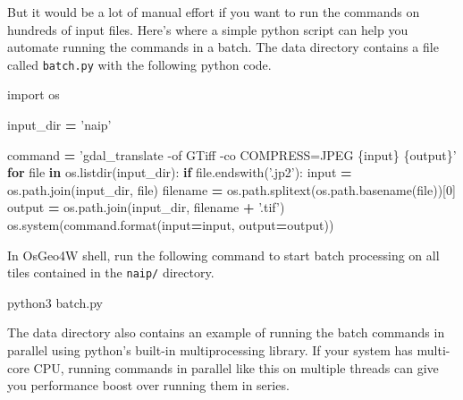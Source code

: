 \documentclass[12pt,a4paper]{article}
\newenvironment{Shaded}{\begin{snugshade}}{\end{snugshade}}
\newcommand{\BuiltInTok}[1]{#1}
\newcommand{\ControlFlowTok}[1]{\textcolor[rgb]{0.13,0.29,0.53}{\textbf{#1}}}
\newcommand{\DecValTok}[1]{\textcolor[rgb]{0.00,0.00,0.81}{#1}}
\newcommand{\ExtensionTok}[1]{#1}
\newcommand{\ImportTok}[1]{#1}
\newcommand{\KeywordTok}[1]{\textcolor[rgb]{0.13,0.29,0.53}{\textbf{#1}}}
\newcommand{\NormalTok}[1]{#1}
\newcommand{\OperatorTok}[1]{\textcolor[rgb]{0.81,0.36,0.00}{\textbf{#1}}}
\newcommand{\SpecialCharTok}[1]{\textcolor[rgb]{0.00,0.00,0.00}{#1}}
\newcommand{\StringTok}[1]{\textcolor[rgb]{0.31,0.60,0.02}{#1}}
\begin{document}
But it would be a lot of manual effort if you want to run the commands
on hundreds of input files. Here's where a simple python script can help
you automate running the commands in a batch. The data directory
contains a file called \texttt{batch.py} with the following python code.

\begin{Shaded}
\begin{Highlighting}[]
\ImportTok{import}\NormalTok{ os}

\NormalTok{input_dir }\OperatorTok{=} \StringTok{'naip'}

\NormalTok{command }\OperatorTok{=} \StringTok{'gdal_translate -of GTiff -co COMPRESS=JPEG }\SpecialCharTok{\{input\}}\StringTok{ }\SpecialCharTok{\{output\}}\StringTok{'}
\ControlFlowTok{for} \BuiltInTok{file} \KeywordTok{in}\NormalTok{ os.listdir(input_dir):}
  \ControlFlowTok{if} \BuiltInTok{file}\NormalTok{.endswith(}\StringTok{'.jp2'}\NormalTok{):}
    \BuiltInTok{input} \OperatorTok{=}\NormalTok{ os.path.join(input_dir, }\BuiltInTok{file}\NormalTok{)}
\NormalTok{    filename }\OperatorTok{=}\NormalTok{ os.path.splitext(os.path.basename(}\BuiltInTok{file}\NormalTok{))[}\DecValTok{0}\NormalTok{]}
\NormalTok{    output }\OperatorTok{=}\NormalTok{  os.path.join(input_dir, filename }\OperatorTok{+} \StringTok{'.tif'}\NormalTok{)}
\NormalTok{    os.system(command.}\BuiltInTok{format}\NormalTok{(}\BuiltInTok{input}\OperatorTok{=}\BuiltInTok{input}\NormalTok{, output}\OperatorTok{=}\NormalTok{output))}
\end{Highlighting}
\end{Shaded}

In OsGeo4W shell, run the following command to start batch processing on
all tiles contained in the \texttt{naip/} directory.

\begin{Shaded}
\begin{Highlighting}[]
\ExtensionTok{python3}\NormalTok{ batch.py}
\end{Highlighting}
\end{Shaded}

The data directory also contains an example of running the batch
commands in parallel using python's built-in multiprocessing library. If
your system has multi-core CPU, running commands in parallel like this
on multiple threads can give you performance boost over running them in
series.
\end{document}
